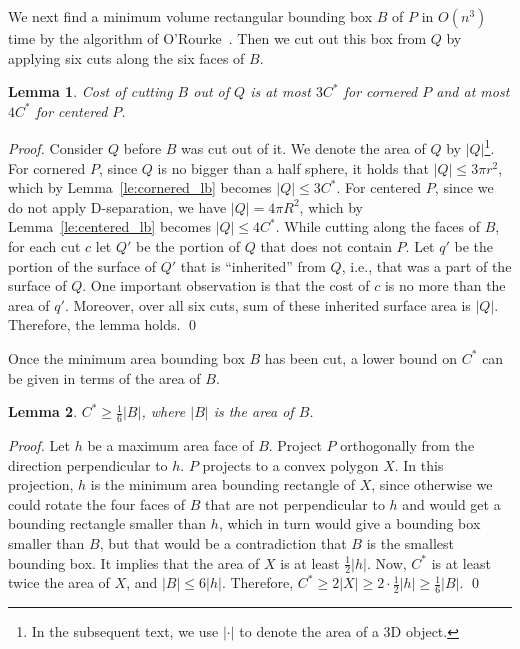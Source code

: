 \documentclass{llncs}
\newtheorem{lem}{Lemma}
\begin{document}
We next find a minimum volume rectangular bounding box $B$ of $P$ in $O(n^3)$ time 
by the algorithm of O'Rourke~\cite{O85}.
Then we cut out this box from $Q$ by applying six cuts along the six faces of $B$.

\begin{lem}
\label{le:garbage1}
Cost of cutting $B$ out of $Q$ is at most $3C^*$ for cornered $P$ and at most $4C^*$ for centered $P$.
\end{lem}

\begin{proof}
Consider $Q$ before $B$ was cut out of it.
We denote the area of $Q$ by $|Q|$\footnote{In the subsequent text, we use $|\cdot|$ to denote the area of a 3D object.}.
For cornered $P$, since $Q$ is no bigger than a half sphere, it holds that $|Q| \le 3\pi r^2$,
which by Lemma~\ref{le:cornered_lb} becomes $|Q| \le 3C^*$. 
For centered $P$, since we do not apply D-separation, we have $|Q|=4\pi R^2$,
which by Lemma~\ref{le:centered_lb} becomes $|Q|\le 4C^*$.
While cutting along the faces of $B$, for each cut $c$ let $Q'$ be the portion of $Q$
that does not contain $P$. 
Let $q'$ be the portion of the surface of $Q'$ that is ``inherited'' from $Q$, 
i.e., that was a part of the surface of $Q$.
One important observation is that the cost of $c$ is no more than the area of $q'$.
Moreover, over all six cuts, sum of these inherited surface area is $|Q|$.
Therefore, the lemma holds.
\qed
\end{proof}

Once the minimum area bounding box $B$ has been cut, a lower bound on $C^*$ can be 
given in terms of the area of $B$.


\begin{lem}
\label{le:lb}
$C^*\ge \frac{1}{6}|B|$, where $|B|$ is the area of $B$.
\end{lem}

\begin{proof}
Let $h$ be a maximum area face of $B$.
Project $P$ orthogonally from the direction perpendicular to $h$.
$P$ projects to a convex polygon $X$.
In this projection, $h$ is the minimum area bounding rectangle of $X$,
since otherwise we could rotate the four faces of $B$ that are not perpendicular to $h$
and would get a bounding rectangle smaller than $h$, which in turn would give a bounding box smaller than $B$,
but that would be a contradiction that $B$ is the smallest bounding box.
It implies that the area of $X$ is at least $\frac{1}{2}|h|$.
Now, $C^*$ is at least twice the area of $X$, and $|B|\le 6|h|$. 
Therefore, $C^* \ge 2|X| \ge 2\cdot\frac{1}{2}|h|\ge \frac{1}{6}|B|$.
\qed
\end{proof}
\end{document}
